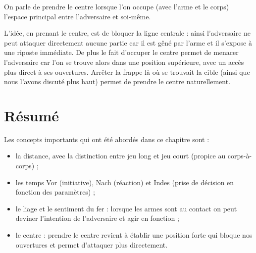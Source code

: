 \begin{definition}

	On parle de prendre le centre lorsque l'on occupe (avec l'arme et le corps) l'espace principal entre l'adversaire et soi-même.
\end{definition}


L'idée, en prenant le centre, est de bloquer la ligne centrale : ainsi l'adversaire ne peut attaquer directement aucune partie car il est gêné par l'arme et il s'expose à une riposte immédiate.
De plus le fait d'occuper le centre permet de menacer l'adversaire car l'on se trouve alors dans une position supérieure, avec un accès plus direct à ses ouvertures.
Arrêter la frappe là où se trouvait la cible (ainsi que nous l'avons discuté plus haut) permet de prendre le centre naturellement.


\section{Résumé}


\noindent
Les concepts importants qui ont été abordés dans ce chapitre sont :
\begin{itemize}
	\item la distance, avec la distinction entre jeu long et jeu court (propice au corps-à-corps) ;
	
	\item les temps Vor (initiative), Nach (réaction) et Indes (prise de décision en fonction des paramètres) ;
	
	\item le liage et le sentiment du fer : lorsque les armes sont au contact on peut deviner l'intention de l'adversaire et agir en fonction ;
	
	\item le centre : prendre le centre revient à établir une position forte qui bloque nos ouvertures et permet d'attaquer plus directement.
\end{itemize}

